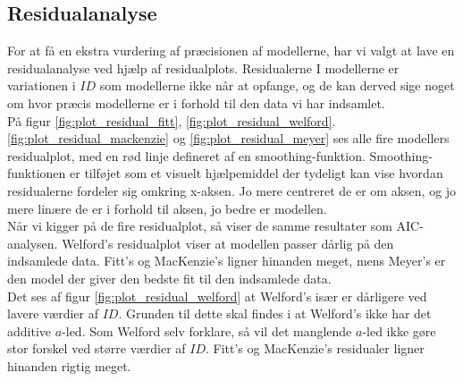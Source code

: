 \subsection*{Residualanalyse}
For at få en ekstra vurdering af præcisionen af modellerne, har vi valgt at lave en residualanalyse ved hjælp af residualplots. Residualerne I modellerne er variationen i $ID$ som modellerne ikke når at opfange, og de kan derved sige noget om hvor præcis modellerne er i forhold til den data vi har indsamlet.\\
På figur \ref{fig:plot_residual_fitt}, \ref{fig:plot_residual_welford}. \ref{fig:plot_residual_mackenzie} og \ref{fig:plot_residual_meyer} ses alle fire modellers residualplot, med en rød linje defineret af en smoothing-funktion. Smoothing-funktionen er tilføjet som et visuelt hjælpemiddel der tydeligt kan vise hvordan residualerne fordeler sig omkring x-aksen. Jo mere centreret de er om aksen, og jo mere linære de er i forhold til aksen, jo bedre er modellen.\\
Når vi kigger på de fire residualplot, så viser de samme resultater som AIC-analysen. Welford's residualplot viser at modellen passer dårlig på den indsamlede data. Fitt's og MacKenzie's ligner hinanden meget, mens Meyer's er den model der giver den bedste fit til den indsamlede data.\\
Det ses af figur \ref{fig:plot_residual_welford} at Welford's især er dårligere ved lavere værdier af $ID$. Grunden til dette skal findes i at Welford's ikke har det additive $a$-led. Som Welford \cite{welford1968} selv forklare, så vil det manglende $a$-led ikke gøre stor forskel ved større værdier af $ID$. Fitt's og MacKenzie's residualer ligner hinanden rigtig meget.

